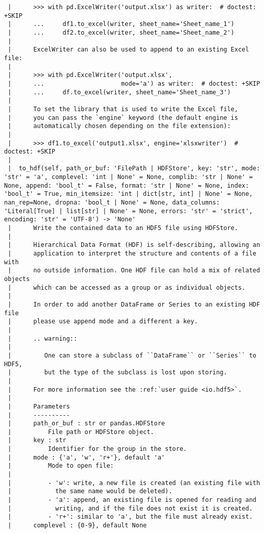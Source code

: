 \documentclass[
  letterpaper,
  DIV=11,
  numbers=noendperiod]{scrreprt}
\begin{document}
\begin{verbatim}
 |      >>> with pd.ExcelWriter('output.xlsx') as writer:  # doctest: +SKIP
 |      ...     df1.to_excel(writer, sheet_name='Sheet_name_1')
 |      ...     df2.to_excel(writer, sheet_name='Sheet_name_2')
 |      
 |      ExcelWriter can also be used to append to an existing Excel file:
 |      
 |      >>> with pd.ExcelWriter('output.xlsx',
 |      ...                     mode='a') as writer:  # doctest: +SKIP
 |      ...     df.to_excel(writer, sheet_name='Sheet_name_3')
 |      
 |      To set the library that is used to write the Excel file,
 |      you can pass the `engine` keyword (the default engine is
 |      automatically chosen depending on the file extension):
 |      
 |      >>> df1.to_excel('output1.xlsx', engine='xlsxwriter')  # doctest: +SKIP
 |  
 |  to_hdf(self, path_or_buf: 'FilePath | HDFStore', key: 'str', mode: 'str' = 'a', complevel: 'int | None' = None, complib: 'str | None' = None, append: 'bool_t' = False, format: 'str | None' = None, index: 'bool_t' = True, min_itemsize: 'int | dict[str, int] | None' = None, nan_rep=None, dropna: 'bool_t | None' = None, data_columns: 'Literal[True] | list[str] | None' = None, errors: 'str' = 'strict', encoding: 'str' = 'UTF-8') -> 'None'
 |      Write the contained data to an HDF5 file using HDFStore.
 |      
 |      Hierarchical Data Format (HDF) is self-describing, allowing an
 |      application to interpret the structure and contents of a file with
 |      no outside information. One HDF file can hold a mix of related objects
 |      which can be accessed as a group or as individual objects.
 |      
 |      In order to add another DataFrame or Series to an existing HDF file
 |      please use append mode and a different a key.
 |      
 |      .. warning::
 |      
 |         One can store a subclass of ``DataFrame`` or ``Series`` to HDF5,
 |         but the type of the subclass is lost upon storing.
 |      
 |      For more information see the :ref:`user guide <io.hdf5>`.
 |      
 |      Parameters
 |      ----------
 |      path_or_buf : str or pandas.HDFStore
 |          File path or HDFStore object.
 |      key : str
 |          Identifier for the group in the store.
 |      mode : {'a', 'w', 'r+'}, default 'a'
 |          Mode to open file:
 |      
 |          - 'w': write, a new file is created (an existing file with
 |            the same name would be deleted).
 |          - 'a': append, an existing file is opened for reading and
 |            writing, and if the file does not exist it is created.
 |          - 'r+': similar to 'a', but the file must already exist.
 |      complevel : {0-9}, default None

\end{verbatim}
\end{document}
